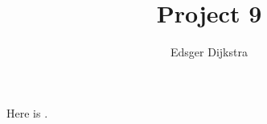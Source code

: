 \documentclass{article}
\title{Project 9}
\author{Edsger Dijkstra}
\begin{document}
\maketitle


Here is \extra{}.


\end{document}
